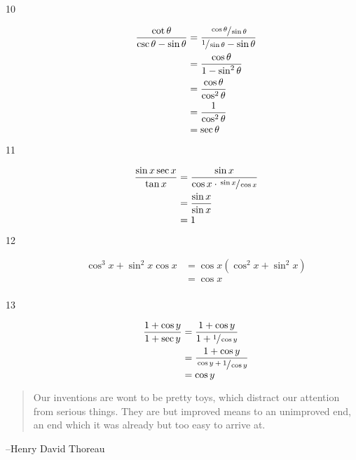 \documentclass{exam}
\begin{document}
\begin{description}
      \item[10] 
        \begin{align*}
          \frac{\cot \theta}{\csc \theta - \sin \theta} & = \frac{\sfrac{\cos \theta}{\sin \theta}}{\sfrac{1}{\sin \theta} - \sin \theta} \\
                                                        & = \frac{\cos \theta}{1 - \sin^2 \theta} \\
                                                        & = \frac{\cos \theta}{\cos^2 \theta} \\
                                                        & = \frac{1}{\cos^2 \theta} \\
                                                        & = \sec \theta \\
        \end{align*}

      \item[11] 
        \begin{align*}
          \frac{\sin x \sec x}{\tan x} & = \frac{\sin x}{\cos x \cdot \sfrac{\sin x}{\cos x}} \\
                                       & = \frac{\sin x}{\sin x} \\
                                       & = 1 \\
        \end{align*}

      \item[12] 
        \begin{align*}
          \cos^3 x + \sin^2 x \cos x & = \cos x \left( \cos^2 x + \sin^2 x \right) \\
                                     & = \cos x \\
        \end{align*}

      \item[13] 
        \begin{align*}
          \frac{1 + \cos y}{1 + \sec y} & = \frac{1 + \cos y}{1 + \sfrac{1}{\cos y}} \\
                                        & = \frac{1 + \cos y}{\sfrac{\cos y + 1}{\cos y}} \\
                                        & = \cos y \\
        \end{align*}

    \end{description}

  \else
    \vspace{5 cm}

    \begin{quote}
      \begin{em}
        Our inventions are wont to be pretty toys, which distract our attention from serious things. They are but
        improved means to an unimproved end, an end which it was already but too easy to arrive at.
      \end{em}
    \end{quote}
    \hspace{1 cm} --Henry David Thoreau
  \fi
\end{document}
